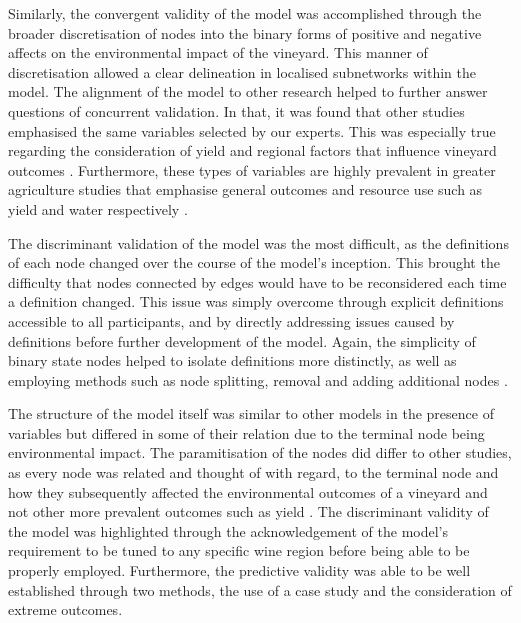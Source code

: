 Similarly, the convergent validity of the model was accomplished through the broader discretisation of nodes into the binary forms of positive and negative affects on the environmental impact of the vineyard. This manner of discretisation allowed a clear delineation in localised subnetworks within the model. The alignment of the model to other research helped to further answer questions of concurrent validation. In that, it was found that other studies emphasised the same variables selected by our experts. This was especially true regarding the consideration of yield and regional factors that influence vineyard outcomes \cite{abbalDecisionSupportSystem2016,campsGrapeHarvestYield2012,hallWithinseasonTemporalVariation2011}. Furthermore, these types of variables are highly prevalent in greater agriculture studies that emphasise general outcomes and resource use such as yield and water respectively \citep{heFruitYieldPrediction2022,laurentLocalInfluenceClimate2022}.

The discriminant validation of the model was the most difficult, as the definitions of each node changed over the course of the model's inception. This brought the difficulty that nodes connected by edges would have to be reconsidered each time a definition changed. This issue was simply overcome through explicit definitions accessible to all participants, and by directly addressing issues caused by definitions before further development of the model. Again, the simplicity of binary state nodes helped to isolate definitions more distinctly, as well as employing methods such as node splitting, removal and adding additional nodes \citep{korbBayesianArtificialIntelligence2011}.

The structure of the model itself was similar to other models in the presence of variables but differed in some of their relation due to the terminal node being environmental impact. The paramitisation of the nodes did differ to other studies, as every node was related and thought of with regard, to the terminal node and how they subsequently affected the environmental outcomes of a vineyard and not other more prevalent outcomes such as yield \citep{laurentReviewIssuesMethods2021}. The discriminant validity of the model was highlighted through the acknowledgement of the model's requirement to be tuned to any specific wine region before being able to be properly employed. Furthermore, the predictive validity was able to be well established through two methods, the use of a case study and the consideration of extreme outcomes.

